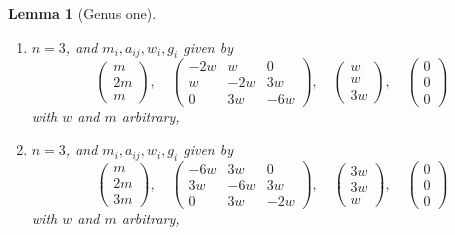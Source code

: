 \documentclass{stacks-project}
\theoremstyle{plain}
\newtheorem{lemma}[subsection]{Lemma}
\theoremstyle{definition}
\theoremstyle{remark}
\numberwithin{equation}{subsection}
\begin{document}
\begin{lemma}[Genus one]
\begin{enumerate}
$$\right),
\quad
\left(
\begin{matrix}
w \\
w \\
w
\end{matrix}
\right),
\quad
\left(
\begin{matrix}
0 \\
0 \\
0
\end{matrix}
\right)
$$
with $w$ and $m$ arbitrary,
\item
\label{item-equal-up3}
$n = 3$, and $m_i, a_{ij}, w_i, g_i$ given by
$$
\left(
\begin{matrix}
m \\
2m \\
m
\end{matrix}
\right),
\quad
\left(
\begin{matrix}
-2w & w & 0 \\
w & -2w & 3w \\
0 & 3w & -6w
\end{matrix}
\right),
\quad
\left(
\begin{matrix}
w \\
w \\
3w
\end{matrix}
\right),
\quad
\left(
\begin{matrix}
0 \\
0 \\
0
\end{matrix}
\right)
$$
with $w$ and $m$ arbitrary,
\item
\label{item-equal-down3}
$n = 3$, and $m_i, a_{ij}, w_i, g_i$ given by
$$
\left(
\begin{matrix}
m \\
2m \\
3m
\end{matrix}
\right),
\quad
\left(
\begin{matrix}
-6w & 3w & 0 \\
3w & -6w & 3w \\
0 & 3w & -2w
\end{matrix}
\right),
\quad
\left(
\begin{matrix}
3w \\
3w \\
w
\end{matrix}
\right),
\quad
\left(
\begin{matrix}
0 \\
0 \\
0
\end{matrix}
\right)
$$
with $w$ and $m$ arbitrary,

\end{enumerate}
\end{lemma}
\end{document}
